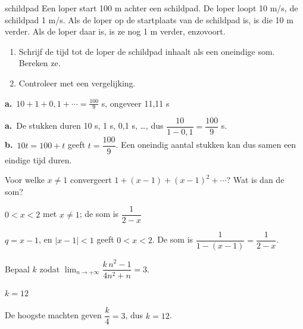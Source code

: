 \begin{oefeningen}
\begin{oefening}[2]
\begin{metprent}{schildpad}
Een loper start 100 m achter een schildpad. De loper loopt 10 m/s, de schildpad 1 m/s. Als de loper op de startplaats van de schildpad is, is die 10 m verder. Als de loper daar is, is ze nog 1 m verder, enzovoort.
\begin{enumerate}
  \item Schrijf de tijd tot de loper de schildpad inhaalt als een oneindige som. Bereken ze.
  \item Controleer met een vergelijking.
\end{enumerate}
\end{metprent}
\begin{solution}
\textbf{a.}~$10+1+0{,}1+\cdots=\tfrac{100}{9}$ s, ongeveer 11,11 s
\end{solution}
\begin{fullsolution}
\textbf{a.}~De stukken duren 10 s, 1 s, 0,1 s, \ldots, dus $\dfrac{10}{1-0{,}1}=\dfrac{100}{9}$ s.\\
\textbf{b.}~$10t=100+t$ geeft $t=\dfrac{100}{9}$. Een oneindig aantal stukken kan dus samen een eindige tijd duren.
\end{fullsolution}
\end{oefening}

\begin{oefening}[2]
Voor welke $x \neq 1$ convergeert $1 + (x-1) + (x-1)^2 + \cdots$? Wat is dan de som?
\begin{solution}
$0<x<2$ met $x\neq 1$; de som is $\dfrac{1}{2-x}$
\end{solution}
\begin{fullsolution}
$q=x-1$, en $|x-1|<1$ geeft $0<x<2$. De som is $\dfrac{1}{1-(x-1)}=\dfrac{1}{2-x}$.
\end{fullsolution}
\end{oefening}

\begin{oefening}[2]
Bepaal $k$ zodat $\displaystyle\lim_{n\to+\infty} \dfrac{k\,n^2 - 1}{4n^2 + n} = 3$.
\begin{solution}
$k=12$
\end{solution}
\begin{fullsolution}
De hoogste machten geven $\dfrac{k}{4}=3$, dus $k=12$.
\end{fullsolution}
\end{oefening}


\end{oefeningen}
